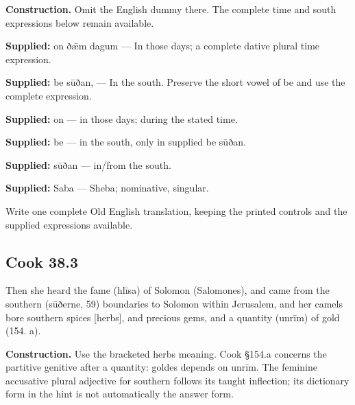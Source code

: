 \textbf{Construction.} Omit the English dummy there. The complete time and south expressions below remain available.

\textbf{Supplied:} on ðǣm dagum — In those days; a complete dative plural time expression.

\textbf{Supplied:} be sūðan, — In the south. Preserve the short vowel of be and use the complete expression.

\textbf{Supplied:} on — in those days; during the stated time.

\textbf{Supplied:} be — in the south, only in supplied be sūðan.

\textbf{Supplied:} sūðan — in/\allowbreak{}from the south.

\textbf{Supplied:} Saba — Sheba; nominative, singular.

Write one complete Old English translation, keeping the printed controls and the supplied expressions available.

\par\begin{minipage}{\linewidth}\raggedright
\subsection*{Cook 38.3}

Then she heard the fame (hlīsa) of Solomon (Salomones), and came from the southern (sūðerne, 59) boundaries to Solomon within Jerusalem, and her camels bore southern spices [herbs], and precious gems, and a quantity (unrīm) of gold (154. a).

\end{minipage}\par\addvspace{4pt}

\textbf{Construction.} Use the bracketed herbs meaning. Cook §154.a concerns the partitive genitive after a quantity: goldes depends on unrīm. The feminine accusative plural adjective for southern follows its taught inflection; its dictionary form in the hint is not automatically the answer form.

